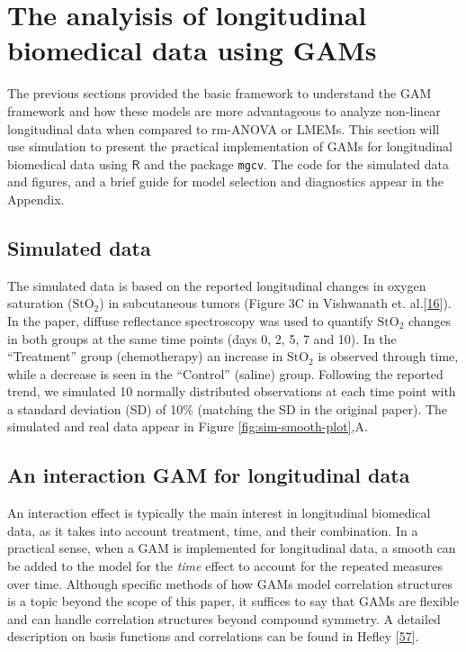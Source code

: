 \documentclass[
]{article}
\newcommand{\passthrough}[1]{#1}
\begin{document}
\hypertarget{longitudinal-GAMs}{%
\section{The analyisis of longitudinal biomedical data using GAMs}\label{longitudinal-GAMs}}

The previous sections provided the basic framework to understand the GAM framework and how these models are more advantageous to analyze non-linear longitudinal data when compared to rm-ANOVA or LMEMs. This section will use simulation to present the practical implementation of GAMs for longitudinal biomedical data using \(\textsf{R}\) and the package \passthrough{\lstinline!mgcv!}. The code for the simulated data and figures, and a brief guide for model selection and diagnostics appear in the Appendix.

\hypertarget{simulated-data}{%
\subsection{Simulated data}\label{simulated-data}}

The simulated data is based on the reported longitudinal changes in oxygen saturation (\(\mbox{StO}_2\)) in subcutaneous tumors (Figure 3C in Vishwanath et. al.{[}\protect\hyperlink{ref-vishwanath2009}{16}{]}). In the paper, diffuse reflectance spectroscopy was used to quantify \(\mbox{StO}_2\) changes in both groups at the same time points (days 0, 2, 5, 7 and 10). In the ``Treatment'' group (chemotherapy) an increase in \(\mbox{StO}_2\) is observed through time, while a decrease is seen in the ``Control'' (saline) group. Following the reported trend, we simulated 10 normally distributed observations at each time point with a standard deviation (SD) of 10\% (matching the SD in the original paper).
The simulated and real data appear in Figure \ref{fig:sim-smooth-plot},A.

\hypertarget{an-interaction-gam-for-longitudinal-data}{%
\subsection{An interaction GAM for longitudinal data}\label{an-interaction-gam-for-longitudinal-data}}

An interaction effect is typically the main interest in longitudinal biomedical data, as it takes into account treatment, time, and their combination. In a practical sense, when a GAM is implemented for longitudinal data, a smooth can be added to the model for the \emph{time} effect to account for the repeated measures over time. Although specific methods of how GAMs model correlation structures is a topic beyond the scope of this paper, it suffices to say that GAMs are flexible and can handle correlation structures beyond compound symmetry. A detailed description on basis functions and correlations can be found in Hefley {[}\protect\hyperlink{ref-hefley2017}{57}{]}.
\end{document}
